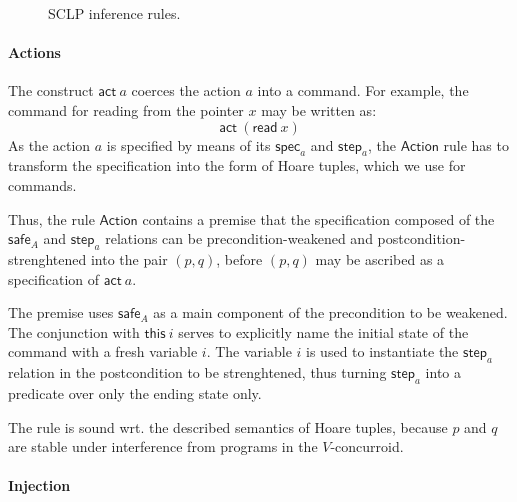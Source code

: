 \begin{figure*}[ht]
\caption{SCLP inference rules.}\label{fig:rules}
\end{figure*}


\paragraph{Actions}

The construct $\mathsf{act}\ a$ coerces the action $a$ into a command.
For example, the command for reading from the pointer $x$ may be
written as:
\[
\mathsf{act}\ (\mathsf{read}\ x)
\]
As the action $a$ is specified by means of its $\mathsf{spec}_a$ and
$\mathsf{step}_a$, the $\mathsf{Action}$ rule has to transform the
specification into the form of Hoare tuples, which we use for
commands.

Thus, the rule $\mathsf{Action}$ contains a premise that the
specification composed of the $\mathsf{safe}_A$ and $\mathsf{step}_a$
relations can be precondition-weakened and postcondition-strenghtened
into the pair $(p, q)$, before $(p, q)$ may be ascribed as a
specification of $\mathsf{act}\ a$.

The premise uses $\mathsf{safe}_A$ as a main component of the
precondition to be weakened. The conjunction with $\mathsf{this}\ i$
serves to explicitly name the initial state of the command with a
fresh variable $i$. The variable $i$ is used to instantiate the
$\mathsf{step}_a$ relation in the postcondition to be strenghtened,
thus turning $\mathsf{step}_a$ into a predicate over only the ending
state only.

The rule is sound wrt. the described semantics of Hoare tuples,
because $p$ and $q$ are stable under interference from programs in the
$V$-concurroid.


\paragraph{Injection}

